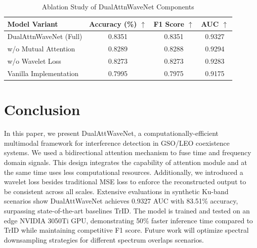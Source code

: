 \documentclass[conference]{IEEEtran}
\begin{document}
\begin{table}[t]
    \caption{Ablation Study of DualAttnWaveNet Components}
    \label{tab:ablation}
    \centering

    \begin{tabular}{lccc}
        \toprule
        \textbf{Model Variant} & \textbf{Accuracy (\%)} $\uparrow$ & \textbf{F1 Score} $\uparrow$ & \textbf{AUC} $\uparrow$ \\
        \midrule
        DualAttnWaveNet (Full) & 0.8351                            & 0.8351                       & 0.9327                  \\
        \cmidrule{1-4}
        w/o Mutual Attention   & 0.8289                            & 0.8288                       & 0.9294                  \\
        w/o Wavelet Loss       & 0.8273                            & 0.8273                       & 0.9283                  \\
        Vanilla Implementation & 0.7995                            & 0.7975                       & 0.9175                  \\
        \bottomrule
    \end{tabular}

\end{table}

\section{Conclusion}
\label{sec:conclusion}

In this paper, we present DualAttWaveNet, a computationally-efficient multimodal framework for interference detection in GSO/LEO coexistence systems. We used a bidirectional attention mechanism to fuse time and frequency domain signals. This design integrates the capability of attention module and at the same time uses less computational resources. Additionally, we introduced a wavelet loss besides traditional MSE loss to enforce the reconstructed output to be consistent across all scales. Extensive evaluations in synthetic Ku-band scenarios show DualAttWaveNet achieves 0.9327 AUC with 83.51\% accuracy, surpassing state-of-the-art baselines TrID. The model is trained and tested on an edge NVIDIA 3050Ti GPU, demonstrating 50\% faster inference time compared to TrID while maintaining competitive F1 score. Future work will optimize spectral downsampling strategies for different spectrum overlaps scenarios.



\end{document}
